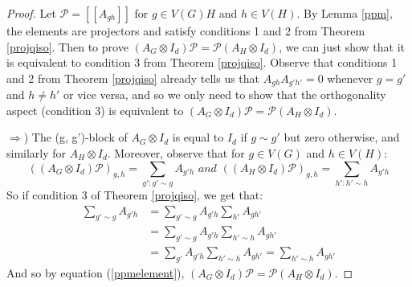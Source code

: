 \documentclass[12pt]{article}
\begin{document}
\begin{proof}
Let $\mathcal{P} = [[A_{gh}]]$ for $g \in V(G)H$ and $h \in V(H)$. By
Lemma \ref{ppm}, the elements are projectors and satisfy conditions 1
and 2 from Theorem \ref{projqiso}. Then to prove $(A_G \otimes
I_d)\mathcal{P} = \mathcal{P} (A_H \otimes I_d)$, we can just show
that it is equivalent to condition 3 from Theorem
\ref{projqiso}. Observe that conditions 1 and 2 from Theorem
\ref{projqiso} already tells us that $A_{gh}A_{g'h'} = 0$ whenever $g
= g'$ and $h \neq h'$ or vice versa, and so we only need to show that
the orthogonality aspect (condition 3) is equivalent to $(A_G \otimes
I_d)\mathcal{P} = \mathcal{P} (A_H \otimes I_d)$.

$\Rightarrow$) The (g, g')-block of $A_G \otimes I_d$ is equal to
$I_d$ if $g \sim g'$ but zero otherwise, and similarly for $A_H
\otimes I_d$. Moreover, observe that for $g \in V(G)$ and $h \in
V(H)$:
\begin{equation}
\label{ppmelement}
((A_G \otimes I_d)\mathcal{P})_{g,h} = \sum_{g':g' \sim g} A_{g'h}
\textit{ and } ((A_H \otimes I_d)\mathcal{P})_{g,h} = \sum_{h':h' \sim
  h} A_{g'h}
\end{equation} 
So if condition 3 of Theorem \ref{projqiso}, we get that:
\begin{align*}
\sum_{g' \sim g} A_{g'h} &= \sum_{g' \sim g} A_{g'h} \sum_{h'} A_{gh'}
\\ &= \sum_{g' \sim g} A_{g'h} \sum_{h' \sim h} A_{gh'}\\ &= \sum_{g'}
A_{g'h} \sum_{h' \sim h} A_{gh'} = \sum_{h' \sim h} A_{gh'}
\end{align*}
And so by equation (\ref{ppmelement}), $(A_G \otimes I_d)\mathcal{P} =
\mathcal{P} (A_H \otimes I_d)$.


\end{proof}
\end{document}
